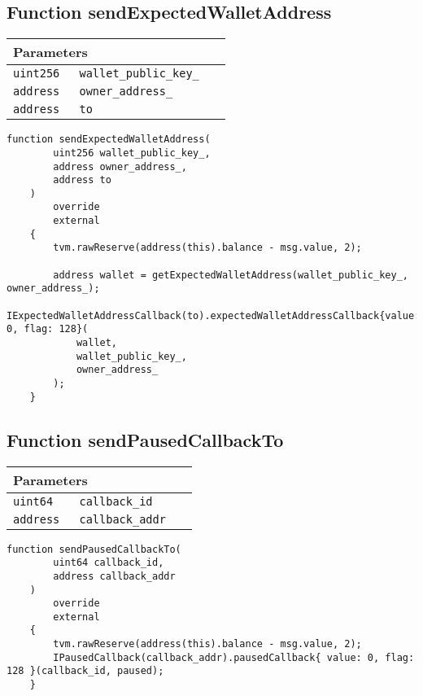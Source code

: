 \subsection{Function sendExpectedWalletAddress}


\ifsoltables
\noindent\begin{tabular}{|l|l|p{5cm}|}\hline
\multicolumn{3}{|l|}{\bf Parameters}\\\hline
\tt uint256 & \tt wallet\_{}public\_{}key\_{} &\\\hline
\tt address & \tt owner\_{}address\_{} &\\\hline
\tt address & \tt to &\\\hline
\end{tabular}
\fi

\vspace{2cm}

\begin{lstlisting}[firstnumber=134]
    function sendExpectedWalletAddress(
        uint256 wallet_public_key_,
        address owner_address_,
        address to
    )
        override
        external
    {
        tvm.rawReserve(address(this).balance - msg.value, 2);

        address wallet = getExpectedWalletAddress(wallet_public_key_, owner_address_);
        IExpectedWalletAddressCallback(to).expectedWalletAddressCallback{value: 0, flag: 128}(
            wallet,
            wallet_public_key_,
            owner_address_
        );
    }
\end{lstlisting}

\subsection{Function sendPausedCallbackTo}


\ifsoltables
\noindent\begin{tabular}{|l|l|p{5cm}|}\hline
\multicolumn{3}{|l|}{\bf Parameters}\\\hline
\tt uint64 & \tt callback\_{}id &\\\hline
\tt address & \tt callback\_{}addr &\\\hline
\end{tabular}
\fi

\vspace{2cm}

\begin{lstlisting}[firstnumber=423]
    function sendPausedCallbackTo(
        uint64 callback_id,
        address callback_addr
    )
        override
        external
    {
        tvm.rawReserve(address(this).balance - msg.value, 2);
        IPausedCallback(callback_addr).pausedCallback{ value: 0, flag: 128 }(callback_id, paused);
    }
\end{lstlisting}

